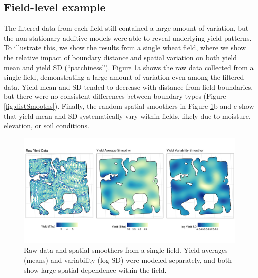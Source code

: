 \documentclass[]{elsarticle} %
\begin{document}
\hypertarget{field-level-example}{%
\subsection{Field-level example}\label{field-level-example}}

The filtered data from each field still contained a large amount of variation, but the non-stationary additive models were able to reveal underlying yield patterns.
To illustrate this, we show the results from a single wheat field, where we show the relative impact of boundary distance and spatial variation on both yield mean and yield SD (``patchiness'').
Figure \ref{fig:spatialSmooths}a shows the raw data collected from a single field, demonstrating a large amount of variation even among the filtered data.
Yield mean and SD tended to decrease with distance from field boundaries, but there were no consistent differences between boundary types (Figure \ref{fig:distSmooths}).
Finally, the random spatial smoothers in Figure \ref{fig:spatialSmooths}b and c show that yield mean and SD systematically vary within fields, likely due to moisture, elevation, or soil conditions.

\begin{figure}
\includegraphics[width=1\linewidth]{../Figures/ExamplePlots/spatialSmooths} \caption{Raw data and spatial smoothers from a single field. Yield averages (means) and variability (log SD) were modeled separately, and both show large spatial dependence within the field.}\label{fig:spatialSmooths}
\end{figure}
\end{document}
